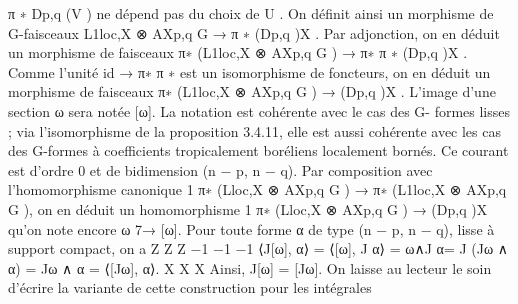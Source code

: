 \documentclass[
  10pt,
]{article}
\newenvironment{Shaded}{}{}
\newcommand{\NormalTok}[1]{#1}
\begin{document}
\begin{Shaded}
\begin{Highlighting}[]
\NormalTok{π ∗ Dp,q (V ) ne dépend pas du choix de U . On définit ainsi un morphisme de G{-}faisceaux}
\NormalTok{                                L1loc,X ⊗ AXp,q}
\NormalTok{                                             G}
\NormalTok{                                                → π ∗ (Dp,q )X .}
\NormalTok{Par adjonction, on en déduit un morphisme de faisceaux}
\NormalTok{                            π∗ (L1loc,X ⊗ AXp,q}
\NormalTok{                                             G}
\NormalTok{                                                ) → π∗ π ∗ (Dp,q )X .}
\NormalTok{Comme l’unité id → π∗ π ∗ est un isomorphisme de foncteurs, on en déduit un morphisme}
\NormalTok{de faisceaux}
\NormalTok{                               π∗ (L1loc,X ⊗ AXp,q}
\NormalTok{                                                G}
\NormalTok{                                                   ) → (Dp,q )X .}
\NormalTok{   L’image d’une section ω sera notée [ω]. La notation est cohérente avec le cas des G{-}}
\NormalTok{formes lisses ; via l’isomorphisme de la proposition 3.4.11, elle est aussi cohérente avec}
\NormalTok{les cas des G{-}formes à coefficients tropicalement boréliens localement bornés. Ce courant}
\NormalTok{est d’ordre 0 et de bidimension (n − p, n − q).}
\NormalTok{   Par composition avec l’homomorphisme canonique}
\NormalTok{                               1}
\NormalTok{                         π∗ (Lloc,X ⊗ AXp,q}
\NormalTok{                                         G}
\NormalTok{                                            ) → π∗ (L1loc,X ⊗ AXp,q}
\NormalTok{                                                                 G}
\NormalTok{                                                                    ),}
\NormalTok{on en déduit un homomorphisme}
\NormalTok{                                     1}
\NormalTok{                               π∗ (Lloc,X ⊗ AXp,q}
\NormalTok{                                               G}
\NormalTok{                                                  ) → (Dp,q )X}
\NormalTok{qu’on note encore ω 7→ [ω].}
\NormalTok{  Pour toute forme α de type (n − p, n − q), lisse à support compact, on a}
\NormalTok{                            Z             Z                   Z}
\NormalTok{                      −1           −1           −1}
\NormalTok{   ⟨J[ω], α⟩ = ⟨[ω], J α⟩ =   ω∧J α=           J (Jω ∧ α) =     Jω ∧ α = ⟨[Jω], α⟩.}
\NormalTok{                               X                  X                      X}
\NormalTok{Ainsi, J[ω] = [Jω].}
\NormalTok{  On laisse au lecteur le soin d’écrire la variante de cette construction pour les intégrales}

\end{Highlighting}
\end{Shaded}
\end{document}
